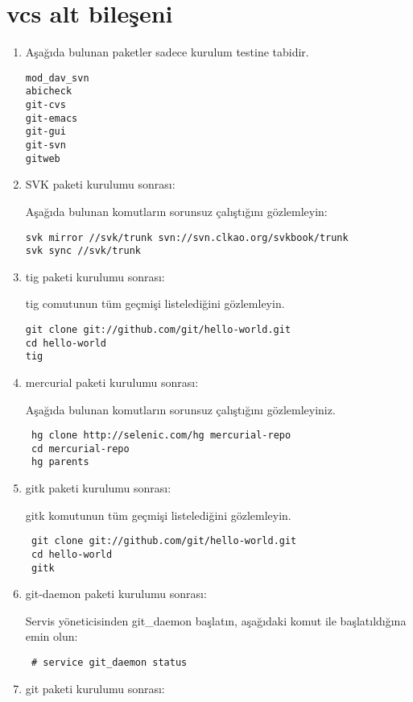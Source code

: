 \documentclass[a4paper,10pt]{article}
\begin{document}
\section{vcs alt bileşeni}
\begin{enumerate}
\item Aşağıda bulunan paketler sadece kurulum testine tabidir.
\begin{verbatim}
mod_dav_svn
abicheck
git-cvs
git-emacs
git-gui
git-svn
gitweb
\end{verbatim}
\item SVK paketi kurulumu sonrası:

Aşağıda bulunan komutların sorunsuz çalıştığını gözlemleyin:
\begin{verbatim}
svk mirror //svk/trunk svn://svn.clkao.org/svkbook/trunk
svk sync //svk/trunk
\end{verbatim}


\item tig paketi kurulumu sonrası:

tig comutunun tüm geçmişi listelediğini gözlemleyin.
\begin{verbatim}
git clone git://github.com/git/hello-world.git 
cd hello-world
tig
\end{verbatim}


\item mercurial paketi kurulumu sonrası:

Aşağıda bulunan komutların sorunsuz çalıştığını gözlemleyiniz.
\begin{verbatim}
 hg clone http://selenic.com/hg mercurial-repo
 cd mercurial-repo
 hg parents
\end{verbatim}


\item gitk paketi kurulumu sonrası:

gitk komutunun tüm geçmişi listelediğini gözlemleyin.
\begin{verbatim}
 git clone git://github.com/git/hello-world.git 
 cd hello-world
 gitk 
\end{verbatim}

\item git-daemon paketi kurulumu sonrası:

Servis yöneticisinden git\_daemon başlatın, aşağıdaki komut ile başlatıldığına emin olun:
\begin{verbatim}
 # service git_daemon status
\end{verbatim}

\item git paketi kurulumu sonrası:


\end{enumerate}
\end{document}
